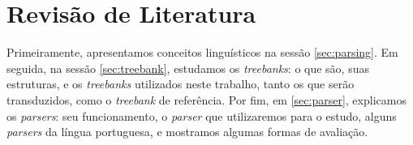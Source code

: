 
\chapter{Revisão de Literatura}
\label{cap:revisaoliteratura}


Primeiramente, apresentamos conceitos linguísticos na sessão \ref{sec:parsing}. Em seguida, na sessão \ref{sec:treebank}, estudamos os \textit{treebanks}: o que são, suas estruturas, e os \textit{treebanks} utilizados neste trabalho, tanto os que serão transduzidos, como o \textit{treebank} de referência. Por fim, em \ref{sec:parser}, explicamos os  \textit{parsers}: seu funcionamento, o \textit{parser} que utilizaremos para o estudo, alguns \textit{parsers} da língua portuguesa, e mostramos algumas formas de avaliação.



